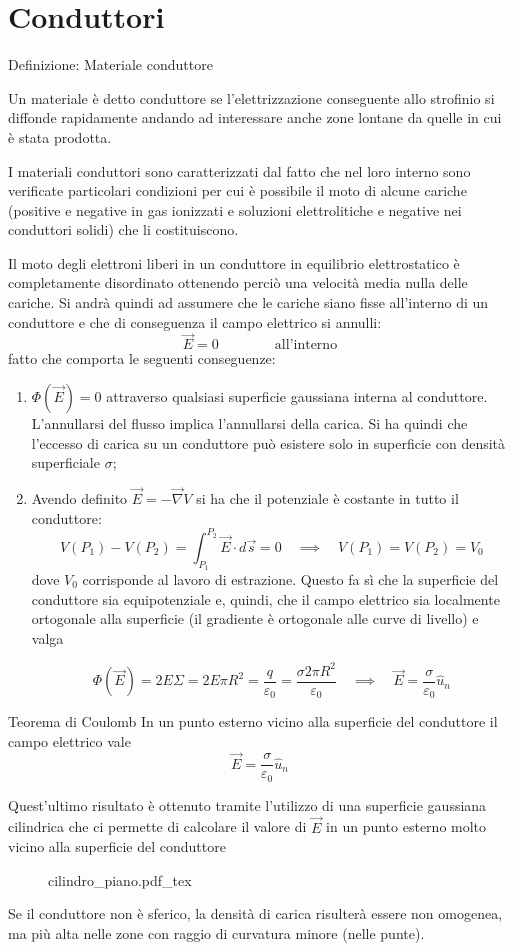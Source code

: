\documentclass[x11names]{report}
\newcommand{\definizione}[2]{
	\begin{center}
		\fboxsep11pt
		\colorbox{myblue}{\begin{minipage}{5.75in}
				\begin{blues}{Definizione: #1}
					#2
				\end{blues}
		\end{minipage}}
	\end{center}
}
\newcommand{\teorema}[2]{
	\begin{center}
		\fboxsep11pt
		\colorbox{myred}{\begin{minipage}{5.75in}
				\begin{redes}{#1}
					#2
				\end{redes}
		\end{minipage}}
	\end{center}
}
\newcommand{\incfig}[1]{%
	{#1.pdf_tex}
}
\begin{document}
\section{Conduttori}
\definizione{Materiale conduttore}{
	Un materiale è detto conduttore se l'elettrizzazione conseguente allo strofinio si diffonde rapidamente andando ad interessare anche zone lontane da quelle in cui è stata prodotta. 
}
I materiali conduttori sono caratterizzati dal fatto che nel loro interno sono verificate particolari condizioni per cui è possibile il moto di alcune cariche (positive e negative in gas ionizzati e soluzioni elettrolitiche e negative nei conduttori solidi) che li costituiscono.

Il moto degli elettroni liberi in un conduttore in equilibrio elettrostatico è completamente disordinato ottenendo perciò una velocità media nulla delle cariche. Si andrà quindi ad assumere che le cariche siano fisse all'interno di un conduttore e che di conseguenza il campo elettrico si annulli:
\[
\vec{E} = 0 \qquad\qquad \text{all'interno}
\]
fatto che comporta le seguenti conseguenze:
\begin{enumerate}
	\item \(\Phi(\vec{E}) = 0\) attraverso qualsiasi superficie gaussiana interna al conduttore. L'annullarsi del flusso implica l'annullarsi della carica. Si ha quindi che l'eccesso di carica su un conduttore può esistere solo in superficie con densità superficiale \(\sigma\);
	\item Avendo definito \(\vec{E} = - \vec{\nabla}V\) si ha che il potenziale è costante in tutto il conduttore:
	\[
	V(P_1) - V(P_2) = \int_{P_1}^{P_2}\vec{E} \cdot d\vec{s} = 0 \quad \implies \quad V(P_1) = V(P_2) = V_0
	\]
	dove \(V_0\) corrisponde al lavoro di estrazione.
	Questo fa sì che la superficie del conduttore sia equipotenziale e, quindi, che il campo elettrico sia localmente ortogonale alla superficie (il gradiente è ortogonale alle curve di livello) e valga
	
	\[
	\Phi(\vec{E}) = 2 E\Sigma = 2 E\pi R^2 = \frac{q}{\varepsilon_0} = \frac{\sigma 2\pi R^2}{\varepsilon_0} \quad \implies \quad \vec{E} = \frac{\sigma}{\varepsilon_0}\hat{u}_n
	\]
\end{enumerate}
\teorema{Teorema di Coulomb}{In un punto esterno vicino alla superficie del conduttore il campo elettrico vale
	\begin{equation}
		\vec{E} = \frac{\sigma}{\varepsilon_0} \hat{u}_n
\end{equation}}
Quest'ultimo risultato è ottenuto tramite l'utilizzo di una superficie gaussiana cilindrica che ci permette di calcolare il valore di \(\vec{E}\) in un punto esterno molto vicino alla superficie del conduttore
\begin{figure}[H]
	\centering
	\incfig{cilindro_piano}
\end{figure}
Se il conduttore non è sferico, la densità di carica risulterà essere non omogenea, ma più alta nelle zone con raggio di curvatura minore (nelle punte).
\end{document}
